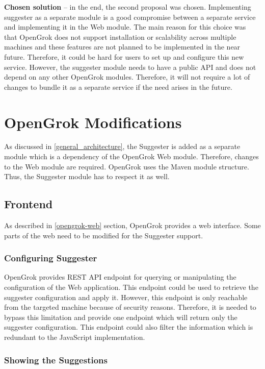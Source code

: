 \textbf{Chosen solution} – in the end, the second proposal was chosen. Implementing suggester as a separate module is a
good compromise between a separate service and implementing it in the Web module. The main reason for this choice was that
OpenGrok does not support installation or scalability across multiple machines and these features are not planned to be
implemented in the near future. Therefore, it could be hard for users to set up and configure this new service.
However, the suggester module needs to have a public API and does not depend on any other OpenGrok modules. Therefore, it
will not require a lot of changes to bundle it as a separate service if the need arises in the future.

\section{OpenGrok Modifications}
\label{opengrok_modifications}

As discussed in \ref{general_architecture}, the Suggester is added as a separate module which is a dependency of the
OpenGrok Web module. Therefore, changes to the Web module are required. OpenGrok uses the Maven module structure.
Thus, the Suggester module has to respect it as well.

\subsection{Frontend}

As described in \ref{opengrok-web} section, OpenGrok provides a web interface. Some parts of the web need to be modified
for the Suggester support.

\subsubsection{Configuring Suggester}
OpenGrok provides REST API endpoint for querying or manipulating the configuration of the Web application.
This endpoint could be used to retrieve the suggester configuration and apply it.
However, this endpoint is only reachable from the targeted machine because of security reasons.
Therefore, it is needed to bypass this limitation and provide one endpoint which will return only the suggester configuration.
This endpoint could also filter the information which is redundant to the JavaScript implementation.

\subsubsection{Showing the Suggestions}
\label{showing_suggestions}

